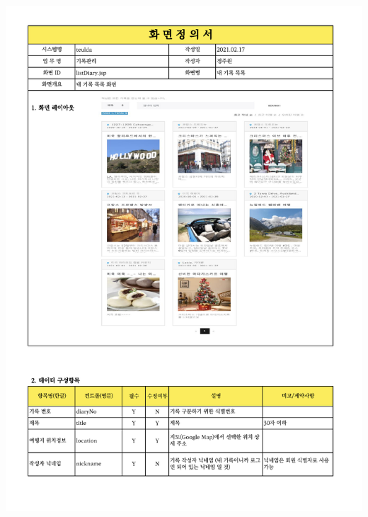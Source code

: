 {{{{{{{{{{{{{{{{{{{{{{{{{{{{{{{{{\includegraphics[width=20cm]{./Figure/Design/Display/diary/diary_15.pdf} \\
}}}}}}}}}}}}}}}}}}}}}}}}}}}}}}}}}
